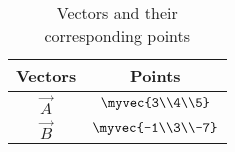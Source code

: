 \begin{table}[h!]
\centering
\begin{tabular}{|c|c|}
\hline
\textbf{Vectors} & \textbf{Points} \\
\hline
$\vec{A}$ & $\myvec{3\\4\\5}$ \\
\hline
$\vec{B}$ & $\myvec{-1\\3\\-7}$ \\
\hline
\end{tabular}
\caption{Vectors and their corresponding points}
\label{tab:vectors-points}
\end{table}
